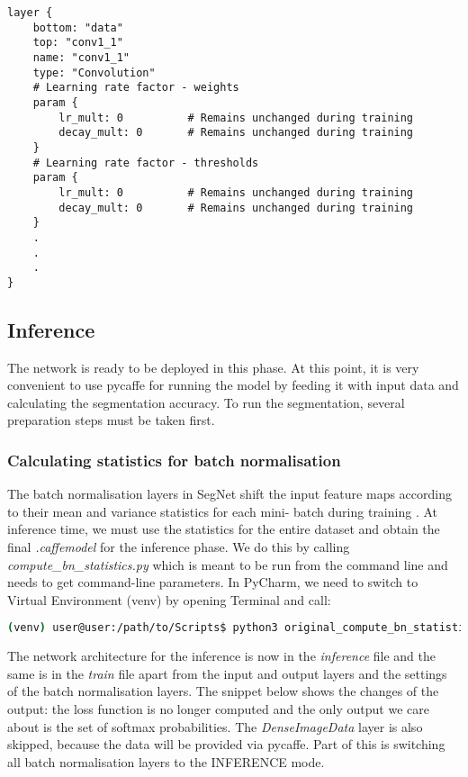 \begin{lstlisting}[caption={Setting up \textit{train.prototxt} for transfer learning \cite{filip_github}},captionpos=b]
layer {
	bottom: "data"
	top: "conv1_1"
	name: "conv1_1"
	type: "Convolution"
	# Learning rate factor - weights
	param {
		lr_mult: 0			# Remains unchanged during training
		decay_mult: 0		# Remains unchanged during training
	}
	# Learning rate factor - thresholds
	param {
		lr_mult: 0			# Remains unchanged during training
		decay_mult: 0		# Remains unchanged during training
	}
	.
	.
	.
}
\end{lstlisting}


\newpage
\subsection{Inference}

The network is ready to be deployed in this phase. At this point, it is very convenient to use pycaffe for running the model by feeding it with input data and calculating the segmentation accuracy. To run the segmentation, several preparation steps must be taken first.

\subsubsection{Calculating statistics for batch normalisation}
The batch normalisation layers in SegNet shift the input feature maps according to their mean and variance statistics for each mini- batch during training \cite{mehlig}. At inference time, we must use the statistics for the entire dataset and obtain the final \textit{.caffemodel} for the inference phase. \cite{segnet_get_started} We do this by calling \textit{compute\_bn\_statistics.py} which is meant to be run from the command line and needs to get command-line parameters. In PyCharm, we need to switch to Virtual Environment (venv) by opening Terminal and call:

\begin{lstlisting}[language=bash]
(venv) user@user:/path/to/Scripts$ python3 original_compute_bn_statistics.py /path/to/train.prototxt /path/to/snap_iter_XY.caffemodel /path/to/inference_folder
\end{lstlisting}

The network architecture for the inference is now in the \textit{inference} file and the same is in the \textit{train} file apart from the input and output layers and the settings of the batch normalisation layers. The snippet below shows the changes of the output: the loss function is no longer computed and the only output we care about is the set of softmax probabilities. The \textit{DenseImageData} layer is also skipped, because the data will be provided via pycaffe. Part of this is switching all batch normalisation layers to the INFERENCE mode. \cite{issue}

